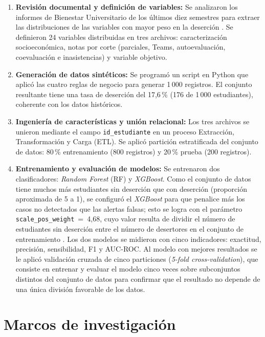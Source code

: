 \documentclass[12pt,letterpaper]{article}
\newcommand{\RF}{\textit{Random Forest} (RF)\xspace}
\newcommand{\XGB}{\textit{XGBoost}\xspace}
\newcommand{\ETL}{Extracción, Transformación y Carga (ETL)\xspace}
\begin{document}
\begin{enumerate}[label=\textbf{Fase \arabic*.}]
  \item \textbf{Revisión documental y definición de variables:} Se analizaron los informes de Bienestar Universitario de los últimos diez semestres para extraer las distribuciones de las variables con mayor peso en la deserción \parencite{etitc_bienestar}. Se definieron 24 variables distribuidas en tres archivos: caracterización socioeconómica, notas por corte (parciales, Teams, autoevaluación, coevaluación e inasistencias) y variable objetivo.

  \item \textbf{Generación de datos sintéticos:} Se programó un script en Python que aplicó las cuatro reglas de negocio para generar 1\,000 registros. El conjunto resultante tiene una tasa de deserción del 17,6\,\% (176 de 1\,000 estudiantes), coherente con los datos históricos.

  \item \textbf{Ingeniería de características y unión relacional:} Los tres archivos se unieron mediante el campo \texttt{id\_estudiante} en un proceso \ETL. Se aplicó partición estratificada del conjunto de datos: 80\,\% entrenamiento (800 registros) y 20\,\% prueba (200 registros).

  \item \textbf{Entrenamiento y evaluación de modelos:} Se entrenaron dos clasificadores: \RF y \XGB. Como el conjunto de datos tiene muchos más estudiantes sin deserción que con deserción (proporción aproximada de 5 a 1), se configuró el \XGB para que penalice más los casos no detectados que las alertas falsas; esto se logra con el parámetro \texttt{scale\_pos\_weight}~=~4,68, cuyo valor resulta de dividir el número de estudiantes sin deserción entre el número de desertores en el conjunto de entrenamiento \parencite{chen2016}. Los dos modelos se midieron con cinco indicadores: exactitud, precisión, sensibilidad, F1 y AUC-ROC. Al modelo con mejores resultados se le aplicó validación cruzada de cinco particiones (\textit{5-fold cross-validation}), que consiste en entrenar y evaluar el modelo cinco veces sobre subconjuntos distintos del conjunto de datos para confirmar que el resultado no depende de una única división favorable de los datos.
\end{enumerate}

\newpage

\section{Marcos de investigación}
\end{document}
